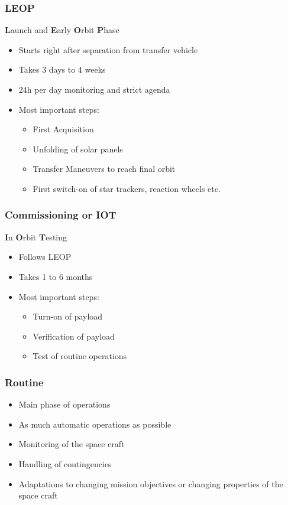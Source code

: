 \documentclass[12pt,utf8,notheorems,compress]{beamer}
\begin{document}
\begin{frame}
  \frametitle{LEOP}
  \pause
  \textbf{L}aunch and \textbf{E}arly \textbf{O}rbit \textbf{P}hase \pause
  \begin{itemize}
  \item Starts right after separation from transfer vehicle \pause 
  \item Takes 3 days to 4 weeks \pause
  \item 24h per day monitoring and strict agenda \pause
  \item Most important steps: \pause
    \begin{itemize}
    \item First Acquisition \pause
    \item Unfolding of solar panels \pause
    \item Transfer Maneuvers to reach final orbit \pause
    \item First switch-on of star trackers, reaction wheels etc.
    \end{itemize}
  \end{itemize}
\end{frame}

\begin{frame}
  \frametitle{Commissioning or IOT}
  \pause
  \textbf{I}n \textbf{O}rbit \textbf{T}esting \pause
  \begin{itemize}
  \item Follows LEOP \pause
  \item Takes 1 to 6 months \pause
  \item Most important steps: \pause
    \begin{itemize}
    \item Turn-on of payload \pause
    \item Verification of payload \pause
    \item Test of routine operations
    \end{itemize}
  \end{itemize}
\end{frame}

\begin{frame}
  \frametitle{Routine}
  \pause
  \begin{itemize}
  \item Main phase of operations \pause
  \item As much automatic operations as possible \pause
  \item Monitoring of the space craft \pause
  \item Handling of contingencies \pause
  \item Adaptations to changing mission objectives or changing properties of the space craft
  \end{itemize}
\end{frame}
\end{document}
